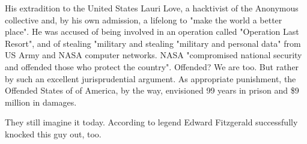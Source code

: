 \begin{multicols}{2}
His extradition to the United States
Lauri Love, a hacktivist of the Anonymous collective and, by his own admission, a lifelong
to "make the world a better place". He was accused of being involved in an operation called
"Operation Last Resort", and of stealing "military and
stealing "military and personal data" from US Army and NASA computer networks.
NASA "compromised national security and offended those who protect the country". Offended? We are too. But rather by such an excellent jurisprudential argument. As
appropriate punishment, the Offended States of
of America, by the way, envisioned 99 years in prison and \$9 million in damages.

They still imagine it today. According to legend
Edward Fitzgerald successfully knocked this guy out, too.





\end{multicols}
